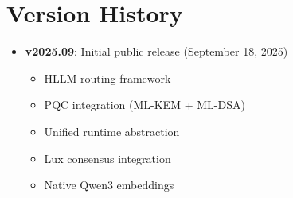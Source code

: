 \section*{Version History}


\begin{itemize}
\item \textbf{v2025.09}: Initial public release (September 18, 2025)
  \begin{itemize}
  \item HLLM routing framework
  \item PQC integration (ML-KEM + ML-DSA)
  \item Unified runtime abstraction
  \item Lux consensus integration
  \item Native Qwen3 embeddings
  \end{itemize}
\end{itemize}

\appendix

